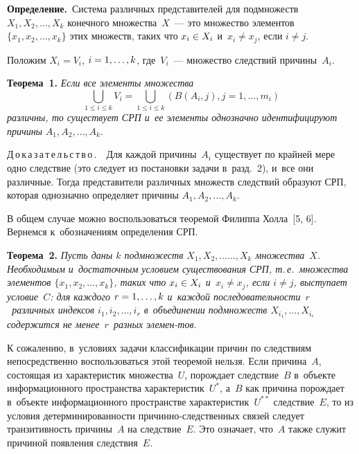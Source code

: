 \begin{multicols}{2}
  \smallskip
  
  \noindent
  \textbf{Определение.}\ Сис\-те\-ма различных пред\-ста\-ви\-те\-лей для подмножеств $X_1, X_2, \ldots , X_k$ 
конечного множества~$X$~--- это множество элементов $\{ x_1, x_2, \ldots , x_k\}$ этих множеств, таких что $x_i\hm\in X_i$ и~$x_i\not= x_j$, если $i\not= j$. 
  
  \smallskip
  
  Положим $X_i=V_i$, $i\hm = 1,\ldots , k$, где~$V_i$~--- множество следствий 
причины~$A_i$.
  
  \smallskip
  
  \noindent
  \textbf{Теорема~1.} \textit{Если все элементы множества}
  $$
  \mathop{\bigcup}\limits_{1\leq i\leq k} V_i = \mathop{\bigcup}\limits_{1\leq i\leq k} 
\left( B(A_i,j), j=1,\ldots , m_i\right)
  $$
\textit{различны, то существует СРП и~ее элементы од\-но\-знач\-но 
идентифицируют причины} $A_1, A_2, \ldots , A_k$.
  
  \smallskip
  
  \noindent
  Д\,о\,к\,а\,з\,а\,т\,е\,л\,ь\,с\,т\,в\,о\,.\ \  Для каж\-дой причины~$A_i$ 
существует по крайней мере одно следствие (это следует из по\-ста\-нов\-ки задачи 
в~разд.~2), и~все они различные. Тогда пред\-ста\-ви\-те\-ли раз\-лич\-ных множеств 
следствий образуют СРП, которая однозначно определяет причины $A_1, A_2, \ldots , A_k$.
  
  В общем случае мож\-но воспользоваться тео\-ре\-мой Филиппа Холла~[5, 6]. 
Вернемся к~обо\-зна\-че\-ни\-ям определения СРП.
  
  \smallskip

  
  \noindent
  \textbf{Теорема~2.} \textit{Пусть даны $k$ подмножеств $X_1, X_2, \ldots$\linebreak $\ldots , 
X_k$ множества~$X$. Необходимым и~достаточным условием существования 
СРП, т.\,е.\ множества элементов $\{x_1, x_2, \ldots , x_k\}$, таких что 
$x_i\hm\in X_i$ и~$x_i\not= x_j$, если $i\not= j$, вы\-сту\-па\-ет условие~$C$: для 
каждого $r\hm = 1,\ldots , k$ и~каждой по\-сле\-до\-ва\-тель\-ности~$r$~раз\-лич\-ных 
индексов $i_1, i_2, \ldots , i_r$ в~объединении подмножеств $X_{i_1}, \ldots , 
X_{i_r}$ содержится не менее~$r$~раз\-ных элемен-\linebreak тов}.
  
  \smallskip
  
  К сожалению, в~условиях задачи классификации причин по следствиям 
непосредственно воспользоваться этой тео\-ре\-мой нельзя. Если причина~$A$, 
со\-сто\-ящая из характеристик множества~$U$, по\-рож\-да\-ет следствие~$B$ 
в~объекте информационного пространства характеристик~$U^*$, а~$B$ как 
причина по\-рож\-да\-ет в~объекте информационного пространстве 
характеристик~$U^{**}$ следствие~$E$, то из условия де\-тер\-ми\-ни\-ро\-ван\-ности 
при\-чин\-но-след\-ст\-вен\-ных связей следует тран\-зи\-тив\-ность причины~$A$ на 
следствие~$E$. Это означает, что~$A$ так\-же служит причиной появления 
след\-ст\-вия~$E$.
  

\end{multicols}
